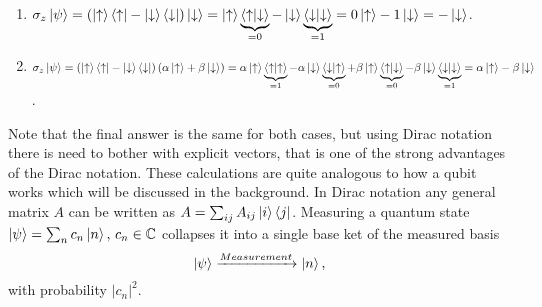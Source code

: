\begin{enumerate}[label=\textbf{\alph*)}]
\item  $\sigma_z \ket{\psi} = (\ket{\uparrow}\bra{\uparrow} - \ket{\downarrow}\bra{\downarrow})\ket{\downarrow} = \ket{\uparrow}\underbrace{\bra{\uparrow}\ket{\downarrow}}_{ = 0} - \ket{\downarrow}\underbrace{\bra{\downarrow}\ket{\downarrow}}_{ = 1} = 0\ket{\uparrow} - 1\ket{\downarrow} = -\ket{\downarrow}$.
\item $\sigma_z \ket{\psi} = \left( \ket{\uparrow}\bra{\uparrow} - \ket{\downarrow}\bra{\downarrow} \right) \left(\alpha\ket{\uparrow} + \beta\ket{\downarrow} \right) = 
\alpha\ket{\uparrow}\underbrace{\bra{\uparrow}\ket{\uparrow}}_{ = 1} - \alpha\ket{\downarrow}\underbrace{\bra{\downarrow}\ket{\uparrow}}_{ = 0}
+
\beta\ket{\uparrow}\underbrace{\bra{\uparrow}\ket{\downarrow}}_{ = 0} - \beta\ket{\downarrow}\underbrace{\bra{\downarrow}\ket{\downarrow}}_{ = 1} = \alpha\ket{\uparrow} - \beta\ket{\downarrow}$.
\end{enumerate}
Note that the final answer is the same for both cases, but using Dirac notation there is need to bother with explicit vectors, that is one of the strong advantages of the Dirac notation. These calculations are quite analogous to how a qubit works which will be discussed in the background. In Dirac notation any general matrix $A$ can be written as $A = \sum_{ij} A_{ij}\ket{i}\bra{j}$. Measuring a quantum state $\ket{\psi} = \sum_{n}c_n\ket{n},\, c_n\in \mathbb{C}$ collapses it into a single base ket of the measured basis
\begin{equation}
\ket{\psi} \xrightarrow{Measurement} \ket{n},
\end{equation}
with probability $|c_n|^2$. 




